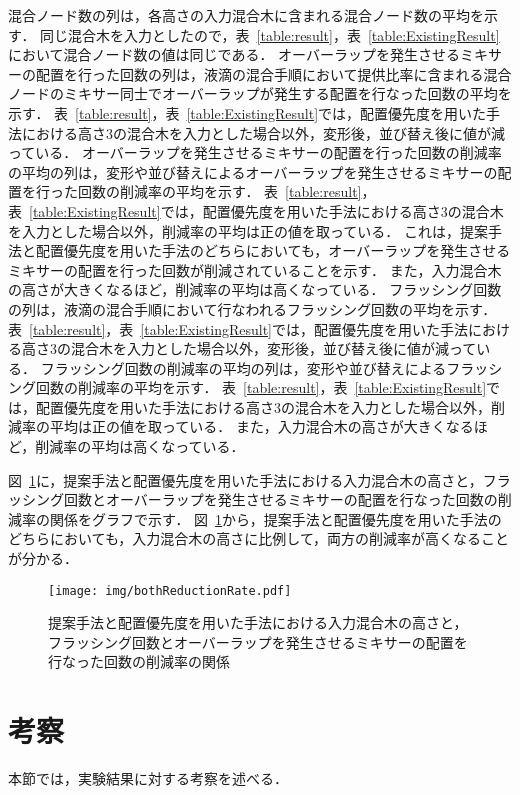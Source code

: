 混合ノード数の列は，各高さの入力混合木に含まれる混合ノード数の平均を示す．
同じ混合木を入力としたので，表~\ref{table:result}，表~\ref{table:ExistingResult}において混合ノード数の値は同じである．
オーバーラップを発生させるミキサーの配置を行った回数の列は，液滴の混合手順において提供比率に含まれる混合ノードのミキサー同士でオーバーラップが発生する配置を行なった回数の平均を示す．
表~\ref{table:result}，表~\ref{table:ExistingResult}では，配置優先度を用いた手法における高さ3の混合木を入力とした場合以外，変形後，並び替え後に値が減っている．
オーバーラップを発生させるミキサーの配置を行った回数の削減率の平均の列は，変形や並び替えによるオーバーラップを発生させるミキサーの配置を行った回数の削減率の平均を示す．
表~\ref{table:result}，表~\ref{table:ExistingResult}では，配置優先度を用いた手法における高さ3の混合木を入力とした場合以外，削減率の平均は正の値を取っている．
これは，提案手法と配置優先度を用いた手法のどちらにおいても，オーバーラップを発生させるミキサーの配置を行った回数が削減されていることを示す．
また，入力混合木の高さが大きくなるほど，削減率の平均は高くなっている．
フラッシング回数の列は，液滴の混合手順において行なわれるフラッシング回数の平均を示す．
表~\ref{table:result}，表~\ref{table:ExistingResult}では，配置優先度を用いた手法における高さ3の混合木を入力とした場合以外，変形後，並び替え後に値が減っている．
フラッシング回数の削減率の平均の列は，変形や並び替えによるフラッシング回数の削減率の平均を示す．
表~\ref{table:result}，表~\ref{table:ExistingResult}では，配置優先度を用いた手法における高さ3の混合木を入力とした場合以外，削減率の平均は正の値を取っている．
また，入力混合木の高さが大きくなるほど，削減率の平均は高くなっている．

図~\ref{fig:FlushingReductionRate}に，提案手法と配置優先度を用いた手法における入力混合木の高さと，フラッシング回数とオーバーラップを発生させるミキサーの配置を行なった回数の削減率の関係をグラフで示す．
図~\ref{fig:FlushingReductionRate}から，提案手法と配置優先度を用いた手法のどちらにおいても，入力混合木の高さに比例して，両方の削減率が高くなることが分かる．

\begin{figure}[tbp]
 \centering\texttt{[image: img/bothReductionRate.pdf]}

 \caption{提案手法と配置優先度を用いた手法における入力混合木の高さと，フラッシング回数とオーバーラップを発生させるミキサーの配置を行なった回数の削減率の関係}

    \label{fig:FlushingReductionRate}
\end{figure}

\section{考察}
本節では，実験結果に対する考察を述べる．

